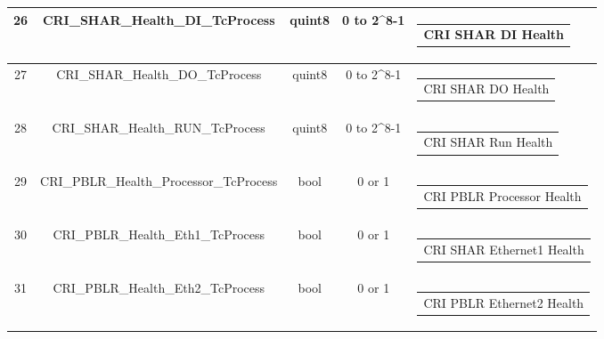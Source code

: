 \begin{landscape}
\begin{longtable}[c]{|c|c|c|c|c|}
		26             & CRI\_SHAR\_Health\_DI\_TcProcess                                                  & quint8            & 0 to 2\textasciicircum 8-1                                                                                               & \begin{tabular}[c]{@{}c@{}} CRI SHAR DI Health \end{tabular}                      \\ \hline
		27             & CRI\_SHAR\_Health\_DO\_TcProcess                                                  & quint8            & 0 to 2\textasciicircum 8-1                                                                                               & \begin{tabular}[c]{@{}c@{}} CRI SHAR DO Health \end{tabular}                      \\ \hline
		28             & CRI\_SHAR\_Health\_RUN\_TcProcess                                                  & quint8            & 0 to 2\textasciicircum 8-1                                                                                               & \begin{tabular}[c]{@{}c@{}} CRI SHAR Run Health \end{tabular}                      \\ \hline
		29             & CRI\_PBLR\_Health\_Processor\_TcProcess                                                  & bool            & 0 or 1                                                                                               & \begin{tabular}[c]{@{}c@{}} CRI PBLR Processor Health \end{tabular}                      \\ \hline
		30             & CRI\_PBLR\_Health\_Eth1\_TcProcess                                                  & bool            & 0 or 1                                                                                                & \begin{tabular}[c]{@{}c@{}} CRI SHAR Ethernet1 Health \end{tabular}                      \\ \hline
		31             & CRI\_PBLR\_Health\_Eth2\_TcProcess                                                  & bool            & 0 or 1                                                                                               & \begin{tabular}[c]{@{}c@{}} CRI PBLR Ethernet2 Health \end{tabular}                      \\ \hline

\end{longtable}
\end{landscape}
